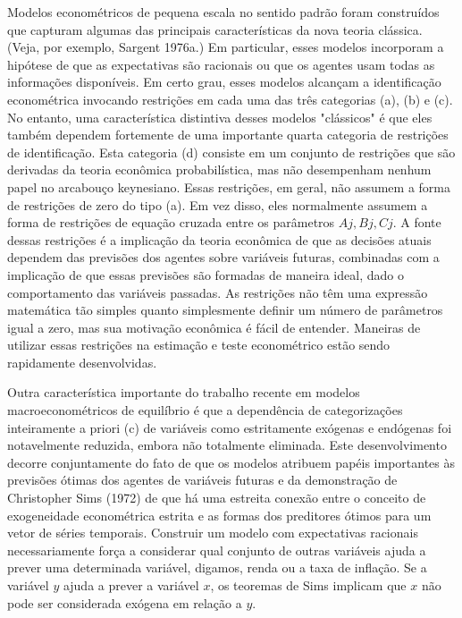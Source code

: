 \documentclass[a4paper,12pt]{article}[abntex2]
\begin{document}
Modelos econométricos de pequena escala no sentido padrão foram construídos que capturam algumas das principais características da nova teoria clássica. (Veja, por exemplo, Sargent 1976a.) Em particular, esses modelos incorporam a hipótese de que as expectativas são racionais ou que os agentes usam todas as informações disponíveis. Em certo grau, esses modelos alcançam a identificação econométrica invocando restrições em cada uma das três categorias (a), (b) e (c). No entanto, uma característica distintiva desses modelos "clássicos" é que eles também dependem fortemente de uma importante quarta categoria de restrições de identificação. Esta categoria (d) consiste em um conjunto de restrições que são derivadas da teoria econômica probabilística, mas não desempenham nenhum papel no arcabouço keynesiano. Essas restrições, em geral, não assumem a forma de restrições de zero do tipo (a). Em vez disso, eles normalmente assumem a forma de restrições de equação cruzada entre os parâmetros $Aj, Bj, Cj$. A fonte dessas restrições é a implicação da teoria econômica de que as decisões atuais dependem das previsões dos agentes sobre variáveis futuras, combinadas com a implicação de que essas previsões são formadas de maneira ideal, dado o comportamento das variáveis passadas. As restrições não têm uma expressão matemática tão simples quanto simplesmente definir um número de parâmetros igual a zero, mas sua motivação econômica é fácil de entender. Maneiras de utilizar essas restrições na estimação e teste econométrico estão sendo rapidamente desenvolvidas.

Outra característica importante do trabalho recente em modelos macroeconométricos de equilíbrio é que a dependência de categorizações inteiramente a priori (c) de variáveis como estritamente exógenas e endógenas foi notavelmente reduzida, embora não totalmente eliminada. Este desenvolvimento decorre conjuntamente do fato de que os modelos atribuem papéis importantes às previsões ótimas dos agentes de variáveis futuras e da demonstração de Christopher Sims (1972) de que há uma estreita conexão entre o conceito de exogeneidade econométrica estrita e as formas dos preditores ótimos para um vetor de séries temporais. Construir um modelo com expectativas racionais necessariamente força a considerar qual conjunto de outras variáveis ajuda a prever uma determinada variável, digamos, renda ou a taxa de inflação. Se a variável $y$ ajuda a prever a variável $x$, os teoremas de Sims implicam que $x$ não pode ser considerada exógena em relação a $y$.
\end{document}
